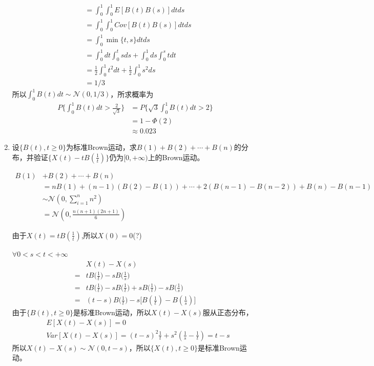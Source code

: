 \begin{enumerate}
\begin{align*}
		       & =\int_{0}^{1}\int_{0}^{1}E[B(t)B(s)]dtds                     \\
		       & =\int_{0}^{1}\int_{0}^{1}Cov[B(t)B(s)]dtds                   \\
		       & =\int_{0}^{1}\min\{t,s\}dtds                                 \\
		       & =\int_{0}^{1}dt\int_{0}^{t}sds+\int_{0}^{1}ds\int_{0}^{s}tdt \\
		       & =\frac{1}{2}\int_{0}^{1}t^2dt+\frac{1}{2}\int_{0}^{1}s^2ds   \\
		       & =1/3
	      \end{align*}
	      所以\(\int_{0}^{1}B(t)dt\sim \mathcal{N}(0,1/3)\)，所求概率为
	      \begin{align*}
		      P\{\int_{0}^{1}B(t)dt>\frac{2}{\sqrt{3}}\}
		       & =P\{\sqrt{3}\int_{0}^{1}B(t)dt>2\} \\
		       & =1-\Phi(2)                         \\
		       & \approx 0.023
	      \end{align*}
	\item 设\(\{B(t),t\geqslant0\}\)为标准Brown运动，求\(B(1)+B(2)+\cdots+B(n)\)的分布，并验证\(\{X(t)-tB(\frac{1}{t})\}\)仍为\([0,+\infty)\)上的Brown运动。

	      \begin{align*}
		      B(1) & +B(2)+\cdots+B(n)                                           \\
		           & =nB(1)+(n-1)(B(2)-B(1))+\cdots+2(B(n-1)-B(n-2))+B(n)-B(n-1) \\
		           & \sim\mathcal{N}(0,\sum_{i=1}^{n}n^2)                        \\
		           & =\mathcal{N}(0,\frac{n(n+1)(2n+1)}{6})
	      \end{align*}

	      由于\(X(t)=tB(\frac{1}{t})\),所以\(X(0)=0\)(?)

	      \(\forall 0<s<t<+\infty\)
	      \begin{align*}
		        & X(t)-X(s)                                                                \\
		      = & tB\bigg(\frac{1}{t}\bigg)-sB\bigg(\frac{1}{s}\bigg)                      \\
		      = & tB\bigg(\frac{1}{t}\bigg)-sB\bigg(\frac{1}{t}\bigg)
		      +sB\bigg(\frac{1}{t}\bigg)-sB\bigg(\frac{1}{s}\bigg)                         \\
		      = & (t-s)B\bigg(\frac{1}{t}\bigg)-s\bigg[B(\frac{1}{t})-B(\frac{1}{s})\bigg]
	      \end{align*}
	      由于\(\{B(t),t\geqslant0\}\)是标准Brown运动，所以\(X(t)-X(s)\)服从正态分布，
	      \begin{align*}
		       & E[X(t)-X(s)]=0                                                     \\
		       & Var[X(t)-X(s)]=(t-s)^2\frac{1}{t}+s^2(\frac{1}{s}-\frac{1}{t})=t-s
	      \end{align*}
	      所以\(X(t)-X(s)\sim \mathcal{N}(0,t-s)\)，所以\(\{X(t),t\geqslant0\}\)是标准Brown运动。
\end{enumerate}

